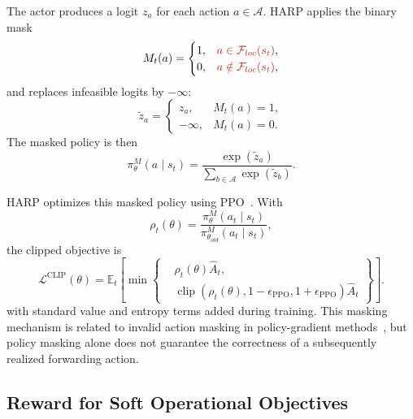 \documentclass[final,5p]{elsarticle}
\newcommand{\rev}[1]{\textcolor{BrickRed}{#1}}
\begin{document}
The actor produces a logit \(z_a\) for each action \(a\in\mathcal{A}\). HARP applies the binary mask
\begin{equation}
M_t(a)=
\begin{cases}
1, & \rev{a\in\mathcal{F}_{loc}(s_t)},\\
0, & \rev{a\notin\mathcal{F}_{loc}(s_t)},
\end{cases}
\end{equation}
and replaces infeasible logits by \(-\infty\):
\begin{equation}
\tilde{z}_a=
\begin{cases}
z_a, & M_t(a)=1,\\
-\infty, & M_t(a)=0.
\end{cases}
\end{equation}
The masked policy is then
\begin{equation}
\pi_\theta^{M}(a\mid s_t)=\frac{\exp(\tilde{z}_a)}{\sum_{b\in\mathcal{A}}\exp(\tilde{z}_b)}.
\end{equation}

\sloppy
HARP optimizes this masked policy using PPO~\cite{schulman2017proximal}. With
\begin{equation}
    \rho_t(\theta)=
    \frac{\pi_\theta^{M}(a_t\mid s_t)}
    {\pi_{\theta_{old}}^{M}(a_t\mid s_t)},
\end{equation}
the clipped objective is
\begin{equation} \label{eq:ppo_clip} \mathcal{L}^{\mathrm{CLIP}}(\theta) = \mathbb{E}_t \left[ \min \left\{ \begin{aligned} &\rho_t(\theta)\hat{A}_t,\\ &\operatorname{clip}\!\left( \rho_t(\theta), 1-\epsilon_{\mathrm{PPO}}, 1+\epsilon_{\mathrm{PPO}} \right)\hat{A}_t \end{aligned} \right\} \right]. \end{equation}
with standard value and entropy terms added during training. This masking mechanism is related to invalid action masking in policy-gradient methods~\cite{huang2022closer}, \rev{but policy masking alone does not guarantee the correctness of a subsequently realized forwarding action}.

\subsection{Reward for Soft Operational Objectives}
\label{subsec:harp_penalty}
\end{document}
